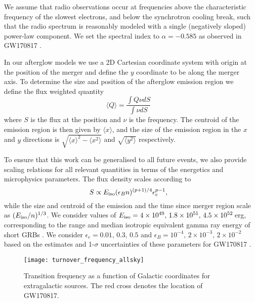 We assume that radio observations occur at frequencies above the characteristic frequency of the slowest electrons, and below the synchrotron cooling break, such that the radio spectrum is reasonably modeled with a single (negatively sloped) power-law component. We set the spectral index to $\alpha=-0.585$ as observed in GW170817 \citep{2018ApJ...863L..18A,2018ApJ...868L..11M,2019MNRAS.489.1919T}.

In our afterglow models we use a 2D Cartesian coordinate system with origin at the position of the merger and define the $y$ coordinate to be along the merger axis. To determine the size and position of the afterglow emission region we define the flux weighted quantity
\vspace{-2pt}
\begin{equation}
\langle Q \rangle = \frac{\int Q\nu dS}{\int \nu dS}
\end{equation}
\vspace{-2pt}where $S$ is the flux at the position and $\nu$ is the frequency. The centroid of the emission region is then given by $\langle x \rangle$, and the size of the emission region in the $x$ and $y$ directions is $\sqrt{\langle x \rangle^2 - \langle x^2 \rangle}$ and $\sqrt{\langle y^2 \rangle}$ respectively.

To ensure that this work can be generalised to all future events, we also provide scaling relations for all relevant quantities in terms of the energetics and microphysics parameters. The flux density scales according to
\vspace{-4pt}
\begin{equation}
    S \propto E_{\rm iso}(\epsilon_{B}n)^{(p+1)/4}\epsilon_{e}^{p-1},
\end{equation}
\vspace{-4pt}while the size and centroid of the emission and the time since merger region scale as $(E_{\rm iso}/n)^{1/3}$. We consider values of $E_{\rm iso}=4\times 10^{49},\, 1.8\times 10^{51},\, 4.5\times 10^{52}$\,erg, corresponding to the range and median isotropic equivalent gamma ray energy of short GRBs \citep{2015ApJ...815..102F}. We consider $\epsilon_{e}=0.01,\,0.3,\, 0.5$ and $\epsilon_{B}=10^{-4},\, 2\times 10^{-3},\, 2\times 10^{-2}$ based on the estimates and 1-$\sigma$ uncertainties of these parameters for GW170817 \citep{2019ApJ...886L..17H}.

\begin{figure}
\centering
\texttt{[image: turnover\_frequency\_allsky]}
\caption[Scintillation transition frequency across the sky]{Transition frequency as a function of Galactic coordinates for extragalactic sources. The red cross denotes the location of GW170817.}
\label{fig:transition_frequency_allsky}
\end{figure}
\vspace{-4pt}
